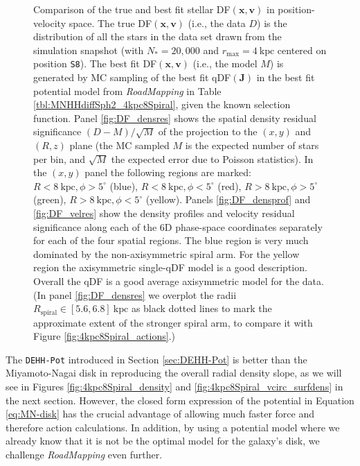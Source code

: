 \documentclass[iop,revtex4,numberedappendix,appendixfloats]{emulateapj}
\newcommand{\vect}[1]{\boldsymbol{#1}}
\newcommand{\RM}{{\sl RoadMapping}}
\begin{document}
\begin{figure}[!htbp]
  \caption{Comparison of the true and best fit stellar DF$(\vect{x},\vect{v})$ in position-velocity space. The true DF$(\vect{x},\vect{v})$ (i.e., the data $D$) is the distribution of all the stars in the data set drawn from the simulation snapshot (with $N_*=20,000$ and $r_\text{max}=4~\text{kpc}$ centered on position \texttt{S8}). The best fit DF$(\vect{x},\vect{v})$ (i.e., the model $M$) is generated by MC sampling of the best fit qDF$(\vect{J})$ in the best fit potential model from \RM{} in Table \ref{tbl:MNHHdiffSph2_4kpc8Spiral}, given the known selection function. Panel \ref{fig:DF_densres} shows the spatial density residual significance $(D-M)/\sqrt{M}$ of the projection to the $(x,y)$ and $(R,z)$ plane (the MC sampled $M$ is the expected number of stars per bin, and $\sqrt{M}$ the expected error due to Poisson statistics). In the $(x,y)$ panel the following regions are marked: $R<8~\text{kpc},\phi>5^\circ$ (blue), $R<8~\text{kpc},\phi<5^\circ$ (red), $R>8~\text{kpc},\phi>5^\circ$ (green), $R>8~\text{kpc},\phi<5^\circ$ (yellow). Panels \ref{fig:DF_densprof} and \ref{fig:DF_velres} show the density profiles and velocity residual significance along each of the 6D phase-space coordinates separately for each of the four spatial regions. The blue region is very much dominated by the non-axisymmetric spiral arm. For the yellow region the axisymmetric single-qDF model is a good description. Overall the qDF is a good average axisymmetric model for the data. (In panel \ref{fig:DF_densres} we overplot the radii $R_\text{spiral} \in [5.6,6.8]~\text{kpc}$ as black dotted lines to mark the approximate extent of the stronger spiral arm, to compare it with Figure \ref{fig:4kpc8Spiral_actions}.)}
  \label{fig:4kpc8Spiral_DF_comparison}
\end{figure}

The \texttt{DEHH-Pot} introduced in Section \ref{sec:DEHH-Pot} is better than the Miyamoto-Nagai disk in reproducing the overall radial density slope, as we will see in Figures \ref{fig:4kpc8Spiral_density} and \ref{fig:4kpc8Spiral_vcirc_surfdens} in the next section. However, the closed form expression of the potential in Equation \eqref{eq:MN-disk} has the crucial advantage of allowing much faster force and therefore action calculations. In addition, by using a potential model where we already know that it is not be the optimal model for the galaxy's disk, we challenge \RM{} even further.

\end{document}
